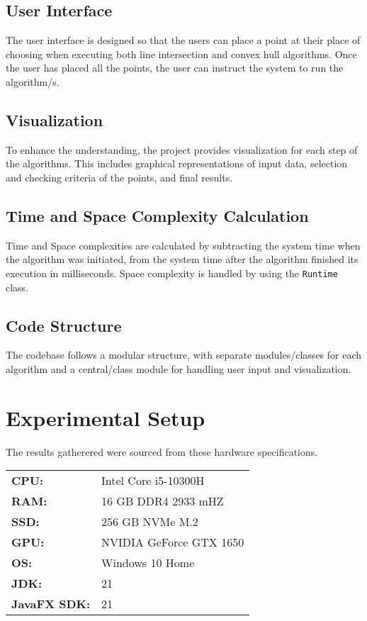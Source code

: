 \documentclass[10pt,twocolumn]{article}
\begin{document}
\subsection*{User Interface}

The user interface is designed so that the users can place a point at their place of choosing when executing both line intersection
and convex hull algorithms. Once the user has placed all the points, the user can instruct the system to run the algorithm/s.

\subsection*{Visualization}

To enhance the understanding, the project provides visualization for each step of the algorithms. This includes graphical representations of input
data, selection and checking criteria of the points, and final results.

\subsection*{Time and Space Complexity Calculation}

Time and Space complexities are calculated by subtracting the system time when the algorithm was initiated, from the system time
after the algorithm finished its execution in milliseconds. Space complexity is handled by using the \texttt{Runtime} class.

\subsection*{Code Structure}

The codebase follows a modular structure, with separate modules/classes for each algorithm and a central/class module for handling user input and visualization.

\section*{Experimental Setup}
The results gatherered were sourced from these hardware specifications.
\begin{tabular}{l l}
    \textbf{CPU:} & Intel Core i5-10300H \\
    \textbf{RAM:} & 16 GB DDR4 2933 mHZ \\
    \textbf{SSD:} & 256 GB NVMe M.2 \\
    \textbf{GPU:} & NVIDIA GeForce GTX 1650 \\
    \textbf{OS:} & Windows 10 Home \\
    \textbf{JDK:} & 21 \\
    \textbf{JavaFX SDK:} & 21 \\
\end{tabular}
\end{document}
